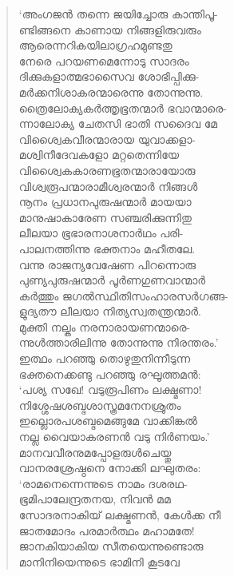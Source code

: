 \begin{verse}
‘അംഗജന്‍ തന്നെ ജയിച്ചോരു കാന്തിപൂ-\\
ണ്ടിങ്ങനെ കാണായ നിങ്ങളിരുവരും\\
ആരെന്നറികയിലാഗ്രഹമുണ്ടതു\\
നേരെ പറയണമെന്നോടു സാദരം\\
ദിക്കുകളാത്മഭാസൈവ ശോഭിപ്പിക്കു-\\
മര്‍ക്കനിശാകരന്മാരെന്നു തോന്നുന്നു.\\
ത്രൈലോക്യകര്‍ത്തൃഭൂതന്മാര്‍ ഭവാന്മാരെ-\\
ന്നാലോക്യ ചേതസി ഭാതി സദൈവ മേ\\
വിശ്വൈകവീരന്മാരായ യുവാക്കളാ-\\
മശ്വിനീദേവകളോ മറ്റതെന്നിയേ\\
വിശ്വൈകകാരണഭൂതന്മാരായോരു\\
വിശ്വരൂപന്മാരാമീശ്വരന്മാര്‍ നിങ്ങള്‍\\
നൂനം പ്രധാനപുരുഷന്മാര്‍ മായയാ\\
മാനുഷാകാരേണ സഞ്ചരിക്കുന്നിതു\\
ലീലയാ ഭൂഭാരനാശനാര്‍ഥം പരി-\\
പാലനത്തിന്നു ഭക്തനാം മഹീതലേ.\\
വന്നു രാജന്യവേഷേണ പിറന്നൊരു\\
പുണ്യപുരുഷന്മാര്‍ പൂര്‍ണഗുണവാന്മാര്‍\\
കര്‍ത്തും ജഗല്‍സ്ഥിതിസംഹാരസര്‍ഗങ്ങ-\\
ളുദ്യതൗ ലീലയാ നിത്യസ്വതന്ത്രന്മാര്‍.\\
മുക്തി നല്കും നരനാരായണന്മാരെ-\\
ന്നുള്‍ത്താരിലിന്നു തോന്നുന്നു നിരന്തരം.’\\
ഇത്ഥം പറഞ്ഞു തൊഴുതുനിന്നീടുന്ന\\
ഭക്തനെക്കണ്ടു പറഞ്ഞു രഘൂത്തമന്‍:\\
‘പശ്യ സഖേ! വടുരൂപിണം ലക്ഷ്മണാ!\\
നിശ്ശേഷശബ്ദശാസ്ത്രമനേനശ്രുതം\\
ഇല്ലൊരപശബ്ദമെങ്ങുമേ വാക്കിങ്കല്‍\\
നല്ല വൈയാകരണന്‍ വടു നിര്‍ണയം.’\\
മാനവവീരനുമപ്പോളരുള്‍ചെയ്തു\\
വാനരശ്രേഷ്ഠനെ നോക്കി ലഘുതരം:\\
‘രാമനെന്നെന്നുടെ നാമം ദശരഥ-\\
ഭൂമിപാലേന്ദ്രതനയ, നിവന്‍ മമ\\
സോദരനാകിയ് ലക്ഷ്മണന്‍, കേള്‍ക്ക നീ\\
ജാതമോദം പരമാര്‍ത്ഥം മഹാമതേ!\\
ജാനകിയാകിയ സീതയെന്നുണ്ടൊരു\\
മാനിനിയെന്നുടെ ഭാമിനി കൂടവേ\\

\end{verse}
